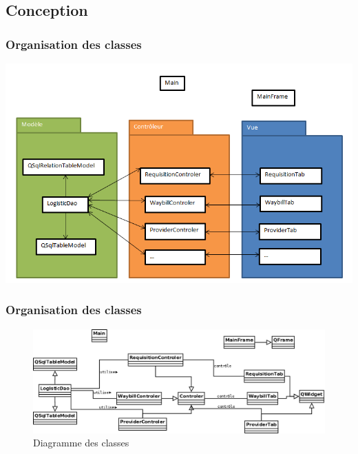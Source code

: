 \subsection{Conception}
	\begin{frame}
		\frametitle{Organisation des classes}
		\begin{center}
			\includegraphics[scale=0.45]{Images/OrganisationClasses}
		\end{center}
	\end{frame}
	\begin{frame}
		\frametitle{Organisation des classes}
		\begin{figure}[htbp]
			\centering
			\includegraphics[scale=0.2]{Images/DiagrammeClasses}
			\caption{Diagramme des classes}
		\end{figure}
	\end{frame}
